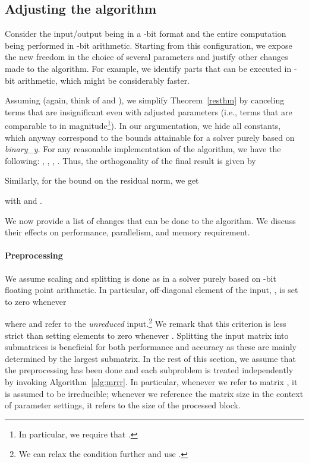 \documentclass[final]{siamltex}
\newcommand{\binaryy}{{\it binary\_\hspace*{0pt}y}}
\begin{document}
\subsection{Adjusting the algorithm} Consider the input/output being in a
-bit format and the entire computation being performed in
-bit arithmetic. Starting from this configuration, we expose the new
freedom in the choice of several parameters and justify other changes made to the algorithm.
For example, we identify parts that can be executed in -bit
arithmetic, which might be considerably faster. 

Assuming  (again, think of  and ), we simplify
Theorem~\ref{resthm} by canceling terms that are insignificant  
even with adjusted parameters (i.e., terms that are comparable to
 in magnitude\footnote{In particular, we require that .}). In our argumentation, we hide all constants,
which anyway correspond to the bounds attainable for a solver purely based
on \binaryy.  For any reasonable implementation of the algorithm, we have the following:
, ,
, . 
Thus, the orthogonality of the final result is given by 

Similarly, for the bound on the residual norm, we get 

with 
 and .

We now provide a list of changes that can be done to the algorithm. 
We discuss their effects on performance, parallelism, and memory
requirement.  

\paragraph{Preprocessing}
We assume scaling and splitting is done as in a solver purely based on -bit
floating point arithmetic. In particular, off-diagonal
element  of the input, , is set to zero whenever
  
where  and  refer to the {\it unreduced} input.\footnote{We can
  relax the condition further and use
  .} 
We remark that this
criterion is less strict than setting elements to zero whenever . Splitting the input matrix into submatrices is
beneficial for both performance and accuracy as these are mainly determined
by the largest submatrix.
In the rest of this
section, we assume that the preprocessing has been done and each subproblem
is treated independently by invoking Algorithm~\ref{alg:mrrr}. In particular, whenever
we refer to matrix , it is assumed to be irreducible; whenever we
reference the matrix size  in the context of parameter settings, it refers
to the size of the processed block. 
\end{document}
